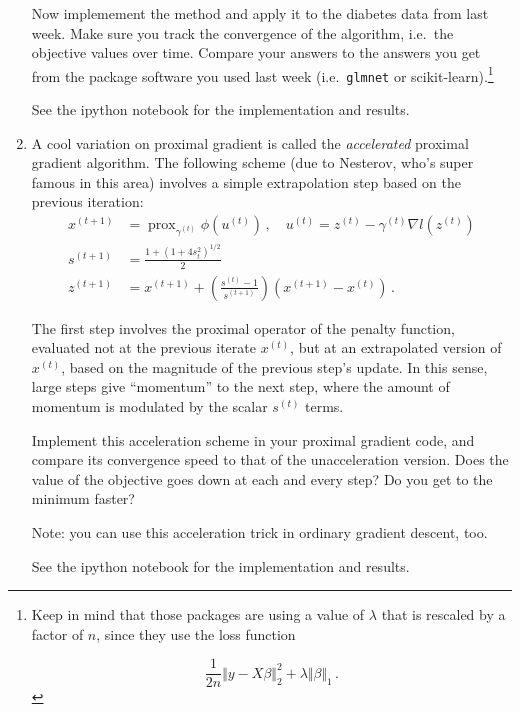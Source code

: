 \documentclass{article}
\DeclareMathOperator*{\prox}{prox}
\newcommand{\enorm}[1]{\Vert #1 \Vert_2}
\begin{document}
\begin{enumerate}[label=(\Alph*)]
{}

Now implemement the method and apply it to the diabetes data from last week.  Make sure you track the convergence of the algorithm, i.e.~the objective values over time.  Compare your answers to the answers you get from the package software you used last week (i.e.~\verb|glmnet| or scikit-learn).\footnote{Keep in mind that those packages are using a value of $\lambda$ that is rescaled by a factor of $n$, since they use the loss function

$$
\frac{1}{2n} \enorm{y - X\beta}^2  + \lambda \Vert \beta \Vert_1 \, .
$$
}

{\color{blue}
See the ipython notebook for the implementation and results.
}

\item A cool variation on proximal gradient is called the \textit{accelerated} proximal gradient algorithm.   The following scheme (due to Nesterov, who's super famous in this area) involves a simple extrapolation step based on the previous iteration:
$$
\begin{aligned}
x^{(t+1)} &= \prox_{ \gamma^{(t)}} \phi(u^{(t)}) \, , \quad u^{(t)} =  z^{(t)} - \gamma^{(t)} \nabla l(z^{(t)})  \\
s^{(t+1)} &= \frac{1 + (1 + 4 s_{t}^2)^{1/2}}{2} \\
z^{(t+1)} &=  x^{(t+1)} + \left( \frac{s^{(t)} - 1}{s^{(t+1)}} \right) (x^{(t+1)} - x^{(t)}) \, .
\end{aligned}
$$



The first step involves the proximal operator of the penalty function, evaluated not at the previous iterate $x^{(t)}$, but at an extrapolated version of $x^{(t)}$, based on the magnitude of the previous step's update.  In this sense, large steps give ``momentum'' to the next step, where the amount of momentum is modulated by the scalar $s^{(t)}$ terms.

Implement this acceleration scheme in your proximal gradient code, and compare its convergence speed to that of the unacceleration version.  Does the value of the objective goes down at each and every step?  Do you get to the minimum faster?

Note: you can use this acceleration trick in ordinary gradient descent, too.

{\color{blue}
See the ipython notebook for the implementation and results.
}

\end{enumerate}
\end{document}
